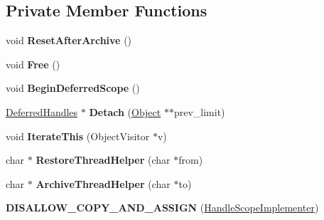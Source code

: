 \subsection*{Private Member Functions}
\begin{DoxyCompactItemize}
\item 
void {\bfseries Reset\+After\+Archive} ()\hypertarget{classv8_1_1internal_1_1_handle_scope_implementer_a2d0f2cb54cf471b3e710b7f817eb8584}{}\label{classv8_1_1internal_1_1_handle_scope_implementer_a2d0f2cb54cf471b3e710b7f817eb8584}

\item 
void {\bfseries Free} ()\hypertarget{classv8_1_1internal_1_1_handle_scope_implementer_aef5db8b0e06aa9be08f8a6c55a649d92}{}\label{classv8_1_1internal_1_1_handle_scope_implementer_aef5db8b0e06aa9be08f8a6c55a649d92}

\item 
void {\bfseries Begin\+Deferred\+Scope} ()\hypertarget{classv8_1_1internal_1_1_handle_scope_implementer_a32718f05d3f28488736ac70429d67f5e}{}\label{classv8_1_1internal_1_1_handle_scope_implementer_a32718f05d3f28488736ac70429d67f5e}

\item 
\hyperlink{classv8_1_1internal_1_1_deferred_handles}{Deferred\+Handles} $\ast$ {\bfseries Detach} (\hyperlink{classv8_1_1internal_1_1_object}{Object} $\ast$$\ast$prev\+\_\+limit)\hypertarget{classv8_1_1internal_1_1_handle_scope_implementer_a3a7f3685e64e380261abfb3890c58a2d}{}\label{classv8_1_1internal_1_1_handle_scope_implementer_a3a7f3685e64e380261abfb3890c58a2d}

\item 
void {\bfseries Iterate\+This} (Object\+Visitor $\ast$v)\hypertarget{classv8_1_1internal_1_1_handle_scope_implementer_a794e5410639b8a61e1b05dcbf5107d6f}{}\label{classv8_1_1internal_1_1_handle_scope_implementer_a794e5410639b8a61e1b05dcbf5107d6f}

\item 
char $\ast$ {\bfseries Restore\+Thread\+Helper} (char $\ast$from)\hypertarget{classv8_1_1internal_1_1_handle_scope_implementer_a439af8ebdc8cc307ce74d2a519a813db}{}\label{classv8_1_1internal_1_1_handle_scope_implementer_a439af8ebdc8cc307ce74d2a519a813db}

\item 
char $\ast$ {\bfseries Archive\+Thread\+Helper} (char $\ast$to)\hypertarget{classv8_1_1internal_1_1_handle_scope_implementer_a830d11903bb5dea39661fe9d493dc14f}{}\label{classv8_1_1internal_1_1_handle_scope_implementer_a830d11903bb5dea39661fe9d493dc14f}

\item 
{\bfseries D\+I\+S\+A\+L\+L\+O\+W\+\_\+\+C\+O\+P\+Y\+\_\+\+A\+N\+D\+\_\+\+A\+S\+S\+I\+GN} (\hyperlink{classv8_1_1internal_1_1_handle_scope_implementer}{Handle\+Scope\+Implementer})\hypertarget{classv8_1_1internal_1_1_handle_scope_implementer_a4af9de6fffd6d62eaede9b3509c56974}{}\label{classv8_1_1internal_1_1_handle_scope_implementer_a4af9de6fffd6d62eaede9b3509c56974}

\end{DoxyCompactItemize}
